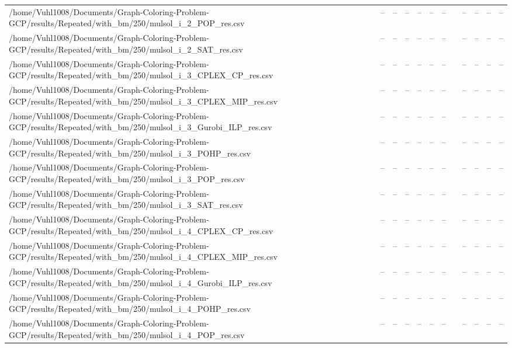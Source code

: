 \begin{table}[htbp]
\begin{tabular}{llllllllllll}
/home/Vuhl1008/Documents/Graph-Coloring-Problem-GCP/results/Repeated/with\_bm/250/mulsol\_i\_2\_POP\_res.csv & -- & -- & -- & -- & -- & -- & {} & -- & -- & -- & -- \\
/home/Vuhl1008/Documents/Graph-Coloring-Problem-GCP/results/Repeated/with\_bm/250/mulsol\_i\_2\_SAT\_res.csv & -- & -- & -- & -- & -- & -- & {} & -- & -- & -- & -- \\
/home/Vuhl1008/Documents/Graph-Coloring-Problem-GCP/results/Repeated/with\_bm/250/mulsol\_i\_3\_CPLEX\_CP\_res.csv & -- & -- & -- & -- & -- & -- & {} & -- & -- & -- & -- \\
/home/Vuhl1008/Documents/Graph-Coloring-Problem-GCP/results/Repeated/with\_bm/250/mulsol\_i\_3\_CPLEX\_MIP\_res.csv & -- & -- & -- & -- & -- & -- & {} & -- & -- & -- & -- \\
/home/Vuhl1008/Documents/Graph-Coloring-Problem-GCP/results/Repeated/with\_bm/250/mulsol\_i\_3\_Gurobi\_ILP\_res.csv & -- & -- & -- & -- & -- & -- & {} & -- & -- & -- & -- \\
/home/Vuhl1008/Documents/Graph-Coloring-Problem-GCP/results/Repeated/with\_bm/250/mulsol\_i\_3\_POHP\_res.csv & -- & -- & -- & -- & -- & -- & {} & -- & -- & -- & -- \\
/home/Vuhl1008/Documents/Graph-Coloring-Problem-GCP/results/Repeated/with\_bm/250/mulsol\_i\_3\_POP\_res.csv & -- & -- & -- & -- & -- & -- & {} & -- & -- & -- & -- \\
/home/Vuhl1008/Documents/Graph-Coloring-Problem-GCP/results/Repeated/with\_bm/250/mulsol\_i\_3\_SAT\_res.csv & -- & -- & -- & -- & -- & -- & {} & -- & -- & -- & -- \\
/home/Vuhl1008/Documents/Graph-Coloring-Problem-GCP/results/Repeated/with\_bm/250/mulsol\_i\_4\_CPLEX\_CP\_res.csv & -- & -- & -- & -- & -- & -- & {} & -- & -- & -- & -- \\
/home/Vuhl1008/Documents/Graph-Coloring-Problem-GCP/results/Repeated/with\_bm/250/mulsol\_i\_4\_CPLEX\_MIP\_res.csv & -- & -- & -- & -- & -- & -- & {} & -- & -- & -- & -- \\
/home/Vuhl1008/Documents/Graph-Coloring-Problem-GCP/results/Repeated/with\_bm/250/mulsol\_i\_4\_Gurobi\_ILP\_res.csv & -- & -- & -- & -- & -- & -- & {} & -- & -- & -- & -- \\
/home/Vuhl1008/Documents/Graph-Coloring-Problem-GCP/results/Repeated/with\_bm/250/mulsol\_i\_4\_POHP\_res.csv & -- & -- & -- & -- & -- & -- & {} & -- & -- & -- & -- \\
/home/Vuhl1008/Documents/Graph-Coloring-Problem-GCP/results/Repeated/with\_bm/250/mulsol\_i\_4\_POP\_res.csv & -- & -- & -- & -- & -- & -- & {} & -- & -- & -- & -- \\

\end{tabular}
\end{table}
